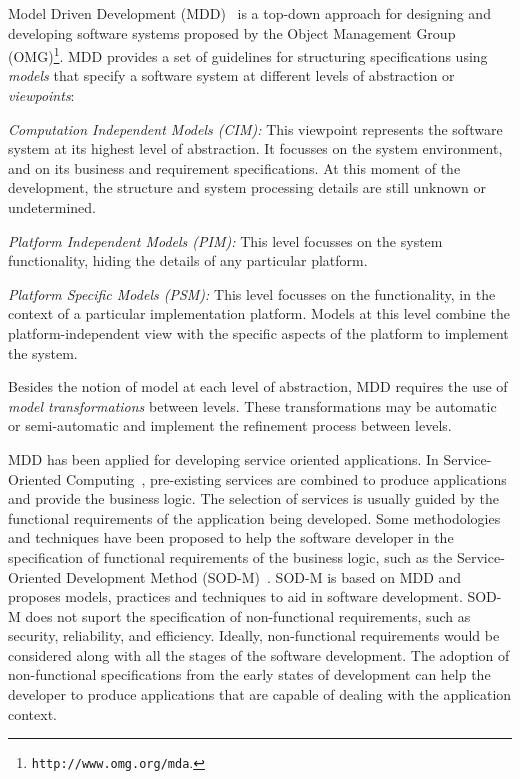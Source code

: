 Model Driven Development (MDD)~\cite{Favre06arigorous} is a top-down approach for  designing and developing software systems 
proposed by the Object Management Group
(OMG)\footnote{\texttt{http://www.omg.org/mda}.}. 
MDD provides a set of
guidelines for  structuring  specifications using
 \textit{models} that specify a software system at different levels of abstraction or \textit{viewpoints}: 

\begin{trivlist}
\item \textit{Computation Independent Models (CIM):} This viewpoint represents the software system at its highest level of abstraction. It focusses on the system
environment, and on its business and requirement specifications. 
At this moment of the development, the structure and system processing details are still unknown or undetermined. 
 
\item \textit{Platform Independent Models (PIM):} This level focusses on the system functionality, hiding the details of any particular platform. 

\item \textit{Platform Specific Models (PSM):} This level focusses on the functionality, in the context of a particular implementation platform.
Models at this level combine the platform-independent view with the specific aspects of the platform to implement the system.  
\end{trivlist}

Besides the notion of model at each level of abstraction, MDD requires the use of \textit{model transformations} between levels.
These transformations may be automatic or semi-automatic and implement the refinement process between levels. 

MDD has been applied for developing service oriented applications.
In Service-Oriented Computing~\cite{Papazoglou2007}, pre-existing services are
combined to produce applications and provide the business logic. The selection of services is usually guided by the functional requirements of the application being developed. 
Some methodologies and techniques have been proposed to help the software
developer in the specification of functional requirements of the business logic,
such as the Service-Oriented Development Method
(SOD-M)~\cite{decastro1}. 
SOD-M is based on MDD and proposes
models, practices and techniques to aid in software development. SOD-M does not
 suport  the specification of non-functional requirements, such as
security, reliability, and efficiency. Ideally, non-functional requirements
would be considered along with all the stages of the software development. The
adoption of non-functional specifications from the early states of development
can help the developer to produce applications that are capable of dealing with
the application context.

